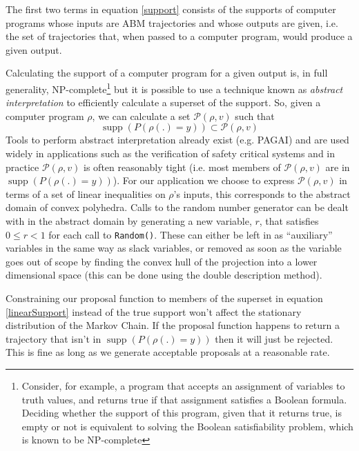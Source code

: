 \documentclass{article}
\DeclareMathOperator\supp{supp}
\begin{document}
The first two terms in equation \ref{support} consists of the supports of computer programs whose inputs are ABM trajectories and whose outputs are given, i.e. the set of trajectories that, when passed to a computer program, would produce a given output.

Calculating the support of a computer program for a given output is, in full generality, NP-complete\footnote{Consider, for example, a program that accepts an assignment of variables to truth values, and returns true if that assignment satisfies a Boolean formula. Deciding whether the support of this program, given that it returns true, is empty or not is equivalent to solving the Boolean satisfiability problem, which is known to be NP-complete\cite{cook1971complexity}} but it is possible to use a technique known as \textit{abstract interpretation}\cite{cousot1977abstract} to efficiently calculate a superset of the support. So, given a computer program $\rho$, we can calculate a set $\mathcal{P}(\rho, v)$ such that
\[
\supp(P(\rho(.)=y)) \subset \mathcal{P}(\rho, v)
\]
Tools to perform abstract interpretation already exist (e.g. PAGAI\cite{henry2012pagai}) and are used widely in applications such as the verification of safety critical systems\cite{blanchet2003static} and in practice $\mathcal{P}(\rho, v)$ is often reasonably tight (i.e. most members of $\mathcal{P}(\rho, v)$ are in $\supp(P(\rho(.)=y))$). For our application we choose to express $\mathcal{P}(\rho, v)$ in terms of a set of linear inequalities on $\rho$'s inputs, this corresponds to the abstract domain of convex polyhedra\cite{cousot1978automatic}\cite{becchi2018efficient}. Calls to the random number generator can be dealt with in the abstract domain by generating a new variable, $r$, that satisfies $0 \le r < 1$ for each call to \texttt{Random()}. These can either be left in as ``auxiliary'' variables in the same way as slack variables, or removed as soon as the variable goes out of scope by finding the convex hull of the projection into a lower dimensional space (this can be done using the double description method\cite{motzkin1953double}).


Constraining our proposal function to members of the superset in equation \ref{linearSupport} instead of the true support won't affect the stationary distribution of the Markov Chain. If the proposal function happens to return a trajectory that isn't in $\supp(P(\rho(.)=y))$ then it will just be rejected. This is fine as long as we generate acceptable proposals at a reasonable rate.
\end{document}
